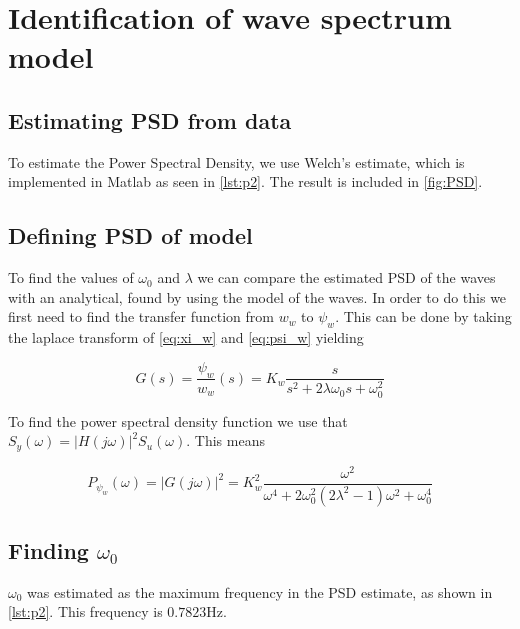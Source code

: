 
\section{Identification of wave spectrum model}

\subsection{Estimating PSD from data}


To estimate the Power Spectral Density, we use Welch's estimate, which is implemented in Matlab as seen in \cref{lst:p2}. The result is included in \cref{fig:PSD}.



\subsection{Defining PSD of model}
To find the values of $\omega_0$ and $\lambda$ we can compare the estimated PSD of the waves with an analytical, found by using the model of the waves. In order to do this we first need to find the transfer function from $w_w$ to $\psi_w$. This can be done by taking the laplace transform of \cref{eq:xi_w} and \cref{eq:psi_w} yielding

\begin{equation}
    G(s) = \frac{\psi_w}{w_w}(s) = K_w\frac{s}{s^2+2\lambda\omega_0s+\omega_0^2} \label{eq:G(s)}
\end{equation}

To find the power spectral density function we use that $S_y(\omega) = |H(j\omega)|^2S_u(\omega)$. This means

\begin{equation}
    P_{\psi_w}(\omega) = |G(j\omega)|^2 = K_w^2\frac{\omega^2}{\omega^4+2\omega_0^2(2\lambda^2-1)\omega^2+\omega_0^4} \label{eq:PSD}
\end{equation}


\subsection{Finding $\omega_0$}

$\omega_0$ was estimated as the maximum frequency in the PSD estimate, as shown in \cref{lst:p2}. This frequency is $0.7823\si{\Hz}$.

